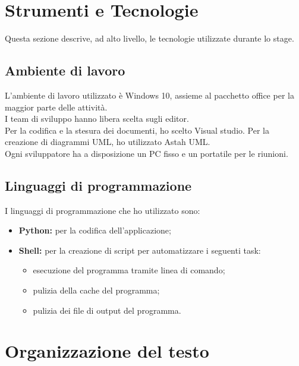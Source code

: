 \section{Strumenti e Tecnologie}
Questa sezione descrive, ad alto livello, le tecnologie utilizzate durante lo stage.
\subsection{Ambiente di lavoro}
L'ambiente di lavoro utilizzato è Windows 10, assieme al pacchetto office per la maggior parte delle attività.\\
I team di sviluppo hanno libera scelta sugli editor.\\Per la codifica e la stesura dei documenti, ho scelto Visual studio. Per la creazione di diagrammi UML, ho utilizzato Astah UML.\\
Ogni sviluppatore ha a disposizione un PC fisso e un portatile per le riunioni.

\subsection{Linguaggi di programmazione}
I linguaggi di programmazione che ho utilizzato sono:
\begin{itemize}
    \item \textbf{Python:} per la codifica dell'applicazione;
    \item \textbf{Shell:} per la creazione di script per automatizzare i seguenti task:
    \begin{itemize}
        \item esecuzione del programma tramite linea di comando;
        \item pulizia della cache del programma;
        \item pulizia dei file di output del programma.
    \end{itemize}
\end{itemize}

\section{Organizzazione del testo}

